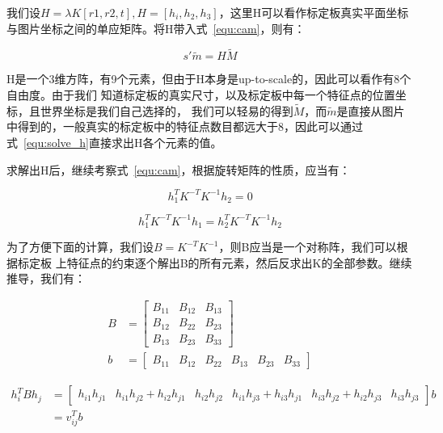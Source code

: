 我们设$H = \lambda K [r1, r2, t], H = [h_i, h_2, h_3]$，这里H可以看作标定板真实平面坐标
与图片坐标之间的单应矩阵。将H带入式~\ref{equ:cam}，则有：

\begin{equation}
	\label{equ:solve_h}
	s' \tilde{m} = H \tilde{M}
\end{equation}

H是一个3维方阵，有9个元素，但由于H本身是up-to-scale的，因此可以看作有8个自由度。由于我们
知道标定板的真实尺寸，以及标定板中每一个特征点的位置坐标，且世界坐标是我们自己选择的，
我们可以轻易的得到$\tilde{M}$，而$\tilde{m}$是直接从图片中得到的，一般真实的标定板中的特征点数目都远大于8，因此可以通过式~\ref{equ:solve_h}直接求出H各个元素的值。

求解出H后，继续考察式~\ref{equ:cam}，根据旋转矩阵的性质，应当有：

\begin{equation}
	\label{equ:const1}
		h_1^T K^{-T} K^{-1} h_2 = 0
\end{equation}

\begin{equation}
	\label{equ:const2}
	h_1^T K^{-T} K^{-1} h_1 = h_2^T K^{-T} K^{-1} h_2
\end{equation}

为了方便下面的计算，我们设$B = K^{-T} K^{-1}$，则B应当是一个对称阵，我们可以根据标定板
上特征点的约束逐个解出B的所有元素，然后反求出K的全部参数。继续推导，我们有：

\begin{equation}
  \begin{aligned}
  	B &=
  	\begin{bmatrix}
  		B_{11} & B_{12} & B_{13} \\
  		B_{12} & B_{22} & B_{23} \\
  		B_{13} & B_{23} & B_{33}
  	\end{bmatrix} \\
  	b &=
  	\begin{bmatrix}
		B_{11} & B_{12} & B_{22} & B_{13} & B_{23} & B_{33}
  	\end{bmatrix}
  \end{aligned}
\end{equation}

\begin{equation}
  \begin{aligned}
  	h_i^T B h_j &= 
  	\begin{bmatrix}
  		h_{i1}h_{j1} & h_{i1}h_{j2} + h_{i2}h_{j1} & h_{i2}h_{j2} &
  		h_{i1}h_{j3} + h_{i3}h_{j1} & h_{i3}h_{j2} + h_{i2}h_{j3} & h_{i3}h_{j3}
  	\end{bmatrix}
  	b \\
  	&= v_{ij}^T b
  \end{aligned}
\end{equation}

